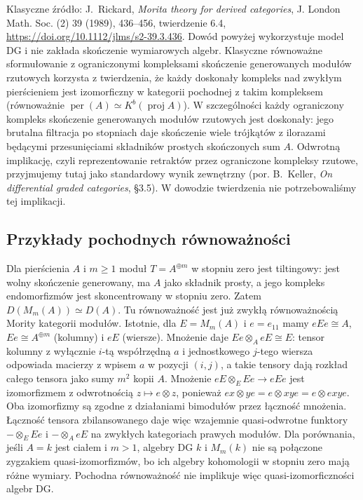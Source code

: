 Klasyczne źródło: J.~Rickard, \emph{Morita theory for derived categories}, J. London Math. Soc. (2) 39 (1989), 436--456, twierdzenie 6.4, \url{https://doi.org/10.1112/jlms/s2-39.3.436}. Dowód powyżej wykorzystuje model DG i nie zakłada skończenie wymiarowych algebr. Klasyczne równoważne sformułowanie z ograniczonymi kompleksami skończenie generowanych modułów rzutowych korzysta z twierdzenia, że każdy doskonały kompleks nad zwykłym pierścieniem jest izomorficzny w kategorii pochodnej z takim kompleksem (równoważnie $\operatorname{per}(A)\simeq K^b(\operatorname{proj} A)$). W szczególności każdy ograniczony kompleks skończenie generowanych modułów rzutowych jest doskonały: jego brutalna filtracja po stopniach daje skończenie wiele trójkątów z ilorazami będącymi przesunięciami składników prostych skończonych sum $A$. Odwrotną implikację, czyli reprezentowanie retraktów przez ograniczone kompleksy rzutowe, przyjmujemy tutaj jako standardowy wynik zewnętrzny (por. B.~Keller, \emph{On differential graded categories}, \S3.5). W dowodzie twierdzenia nie potrzebowaliśmy tej implikacji.

\subsection{Przykłady pochodnych równoważności}

\begin{przyklad}\label{cat:ex:morita-matrix}
Dla pierścienia $A$ i $m\geq1$ moduł $T=A^{\oplus m}$ w stopniu zero jest tiltingowy: jest wolny skończenie generowany, ma $A$ jako składnik prosty, a jego kompleks endomorfizmów jest skoncentrowany w stopniu zero. Zatem $D(M_m(A))\simeq D(A)$. Tu równoważność jest już zwykłą równoważnością Mority kategorii modułów. Istotnie, dla $E=M_m(A)$ i $e=e_{11}$ mamy $eEe\cong A$, $Ee\cong A^{\oplus m}$ (kolumny) i $eE$ (wiersze). Mnożenie daje $Ee\otimes_A eE\cong E$: tensor kolumny z wyłącznie $i$-tą współrzędną $a$ i jednostkowego $j$-tego wiersza odpowiada macierzy z wpisem $a$ w pozycji $(i,j)$, a takie tensory dają rozkład całego tensora jako sumy $m^2$ kopii $A$. Mnożenie $eE\otimes_E Ee\to eEe$ jest izomorfizmem z odwrotnością $z\mapsto e\otimes z$, ponieważ $ex\otimes ye=e\otimes xye=e\otimes exye$. Oba izomorfizmy są zgodne z działaniami bimodułów przez łączność mnożenia. Łączność tensora zbilansowanego daje więc wzajemnie quasi-odwrotne funktory $-\otimes_E Ee$ i $-\otimes_A eE$ na zwykłych kategoriach prawych modułów. Dla porównania, jeśli $A=k$ jest ciałem i $m>1$, algebry DG $k$ i $M_m(k)$ nie są połączone zygzakiem quasi-izomorfizmów, bo ich algebry kohomologii w stopniu zero mają różne wymiary. Pochodna równoważność nie implikuje więc quasi-izomorficzności algebr DG.
\end{przyklad}

